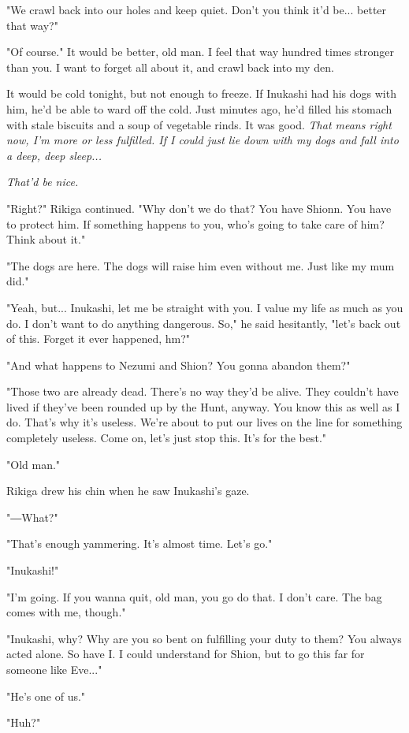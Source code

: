 "We crawl back into our holes and keep quiet. Don't you think it'd be...
better that way?"

"Of course." It would be better, old man. I feel that way hundred times
stronger than you. I want to forget all about it, and crawl back into my
den.

It would be cold tonight, but not enough to freeze. If Inukashi had his
dogs with him, he'd be able to ward off the cold. Just minutes ago, he'd
filled his stomach with stale biscuits and a soup of vegetable rinds. It
was good. \emph{That means right now, I'm more or less fulfilled. If I could
just lie down with my dogs and fall into a deep, deep sleep...}

\emph{That'd be nice.}

"Right?" Rikiga continued. "Why don't we do that? You have Shionn. You
have to protect him. If something happens to you, who's going to take
care of him? Think about it."

"The dogs are here. The dogs will raise him even without me. Just like
my mum did."

"Yeah, but... Inukashi, let me be straight with you. I value my life as
much as you do. I don't want to do anything dangerous. So," he said
hesitantly, "let's back out of this. Forget it ever happened, hm?"

"And what happens to Nezumi and Shion? You gonna abandon them?"

"Those two are already dead. There's no way they'd be alive. They
couldn't have lived if they've been rounded up by the Hunt, anyway. You
know this as well as I do. That's why it's useless. We're about to put
our lives on the line for something completely useless. Come on, let's
just stop this. It's for the best."

"Old man."

Rikiga drew his chin when he saw Inukashi's gaze.

"―What?"

"That's enough yammering. It's almost time. Let's go."

"Inukashi!"

"I'm going. If you wanna quit, old man, you go do that. I don't care.
The bag comes with me, though."

"Inukashi, why? Why are you so bent on fulfilling your duty to them? You
always acted alone. So have I. I could understand for Shion, but to go
this far for someone like Eve..."

"He's one of us."

"Huh?"

